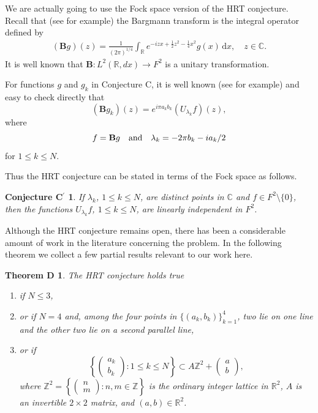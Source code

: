 \documentclass[reqno,11pt]{amsart}
\newtheorem*{conjecturecstar*}{Conjecture C$^\prime$}
\newtheorem*{theoremd*}{Theorem D}
\newcommand{\C}{\mathbb C}
\newcommand{\R}{\mathbb R}
\newcommand{\Z}{\mathbb Z}
\begin{document}
We are actually going to use the Fock space version of the HRT conjecture. 
Recall that (see \cite{Zhu2012, Zhu2019} for example) the Bargmann 
transform is the integral operator defined by  
\begin{align*}
(\mathbf{B}g)(z)=\frac1{(2\pi)^{1/4}}\int_{\R}
e^{-izx+\frac{1}{2}z^2-\frac14x^2}g(x)\,\mathrm{d}x, \quad z\in\C.
\end{align*}
It is well known that $\mathbf{B}: L^2(\R, dx)\rightarrow F^2$ is a unitary 
transformation.  
 
For functions $g$ and $g_k$ in Conjecture C, it is well known (see 
\cite{Zhu2019} for example) and easy to check directly that
\[(\mathbf{B}g_k)(z)=e^{i\pi a_kb_k}(U_{\lambda_k}f)(z),\]
where 
$$f=\mathbf{B}g\quad{\rm and}\quad\lambda_{k}=-2\pi b_{k}-ia_{k}/2$$
for $1\le k\le N$. 

Thus the HRT conjecture can be stated in terms of 
the Fock space as follows.

\begin{conjecturecstar*}
If $\lambda_k$, $1\le k\le N$, are distinct points in $\C$ and 
$f\in F^2\setminus\{0\}$, then the functions $U_{\lambda_k}f$, 
$1\le k\le N$, are linearly independent in $F^2$.
\end{conjecturecstar*}

Although the HRT conjecture remains open, there has been a considerable 
amount of work in the literature concerning the problem. In the following 
theorem we collect a few partial results relevant to our work here. 

\begin{theoremd*}
The HRT conjecture holds true
\begin{enumerate}
\item[(a)] if $N \leq 3$,   
\item[(b)] or if $N = 4$ and, among the four points in $\{(a_k, b_k)\}_{k=1}^{4}$, 
two lie on one line and the other two lie on a second parallel line,
\item[(c)] or if
$$\left\{\begin{pmatrix}a_k\\ b_k\end{pmatrix}: 1\le k\le N\right\}
\subset A\Z^2+\begin{pmatrix} a\\ b\end{pmatrix},$$ 
where $\Z^2=\left\{\begin{pmatrix}n\\ m\end{pmatrix}: n,m\in\Z\right\}$ is the 
ordinary integer lattice in $\R^2$, $A$ is an invertible $2\times2$ matrix, 
and $(a,b)\in\R^2$.
\end{enumerate}
\end{theoremd*}
\end{document}
